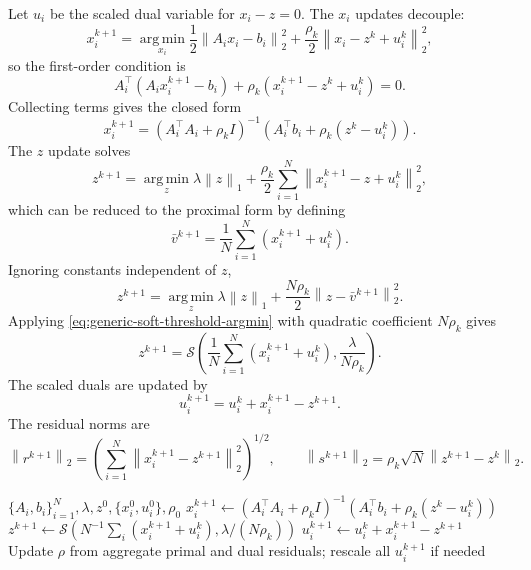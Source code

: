 \documentclass[11pt]{article}
\newcommand{\argmin}{\operatorname*{arg\,min}}
\newcommand{\shrink}{\mathcal{S}}
\newcommand{\norm}[1]{\left\lVert #1 \right\rVert}
\begin{document}
Let $u_i$ be the scaled dual variable for $x_i-z=0$.  The $x_i$ updates
decouple:
\begin{equation}
    x_i^{k+1}
    =
    \argmin_{x_i}
    \frac{1}{2}\norm{A_i x_i-b_i}_2^2
    +
    \frac{\rho_k}{2}\norm{x_i-z^k+u_i^k}_2^2,
\end{equation}
so the first-order condition is
\begin{equation}
    A_i^\top(A_i x_i^{k+1}-b_i)
    +
    \rho_k(x_i^{k+1}-z^k+u_i^k)=0.
\end{equation}
Collecting terms gives the closed form
\begin{equation}
    x_i^{k+1}
    =
    (A_i^\top A_i+\rho_k I)^{-1}
    \left(A_i^\top b_i+\rho_k(z^k-u_i^k)\right).
    \label{eq:consensus-x-update}
\end{equation}
The $z$ update solves
\begin{equation}
    z^{k+1}
    =
    \argmin_z
    \lambda\norm{z}_1
    +
    \frac{\rho_k}{2}\sum_{i=1}^N
    \norm{x_i^{k+1}-z+u_i^k}_2^2,
\end{equation}
which can be reduced to the proximal form by defining
\begin{equation}
    \bar{v}^{k+1}
    =
    \frac{1}{N}\sum_{i=1}^N(x_i^{k+1}+u_i^k).
\end{equation}
Ignoring constants independent of $z$,
\begin{equation}
    z^{k+1}
    =
    \argmin_z
    \lambda\norm{z}_1
    +
    \frac{N\rho_k}{2}\norm{z-\bar{v}^{k+1}}_2^2.
\end{equation}
Applying \eqref{eq:generic-soft-threshold-argmin} with quadratic coefficient
$N\rho_k$ gives
\begin{equation}
    z^{k+1}
    =
    \shrink\left(
        \frac{1}{N}\sum_{i=1}^N (x_i^{k+1}+u_i^k),
        \frac{\lambda}{N\rho_k}
    \right).
    \label{eq:consensus-z-update}
\end{equation}
The scaled duals are updated by
\begin{equation}
    u_i^{k+1}=u_i^k+x_i^{k+1}-z^{k+1}.
\end{equation}
The residual norms are
\begin{equation}
    \norm{r^{k+1}}_2
    =
    \left(\sum_{i=1}^N\norm{x_i^{k+1}-z^{k+1}}_2^2\right)^{1/2},
    \qquad
    \norm{s^{k+1}}_2
    =
    \rho_k\sqrt{N}\norm{z^{k+1}-z^k}_2.
\end{equation}

\begin{algorithm}[t]
\caption{Consensus Lasso ADMM with shared online $\rho$}
\label{alg:consensus-lasso}
\begin{algorithmic}[1]
\Require $\{A_i,b_i\}_{i=1}^N,\lambda,z^0,\{x_i^0,u_i^0\},\rho_0$
        \State $x_i^{k+1}\gets(A_i^\top A_i+\rho_k I)^{-1}
        (A_i^\top b_i+\rho_k(z^k-u_i^k))$
    \EndFor
    \State $z^{k+1}\gets
    \shrink\left(N^{-1}\sum_i(x_i^{k+1}+u_i^k),\lambda/(N\rho_k)\right)$
        \State $u_i^{k+1}\gets u_i^k+x_i^{k+1}-z^{k+1}$
    \EndFor
    \State Update $\rho$ from aggregate primal and dual residuals;
           rescale all $u_i^{k+1}$ if needed
\EndFor
\end{algorithmic}
\end{algorithm}
\end{document}

